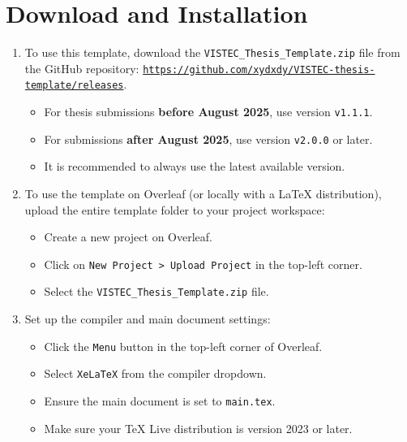 \documentclass{VISTEC}
\begin{document}
\section{Download and Installation}
\label{manual:download}
\begin{paragraph}
\begin{enumerate}[leftmargin=\paritemindent, itemsep=6pt]
\item To use this template, download the \texttt{VISTEC\_Thesis\_Template.zip} file from the GitHub repository: \href{https://github.com/xydxdy/VISTEC-thesis-template/releases}{\texttt{https://github.com/xydxdy/VISTEC-thesis-template/releases}}.

  \begin{itemize}[leftmargin=0.5cm]
    \item For thesis submissions \textbf{before August 2025}, use version \texttt{v1.1.1}.
    \item For submissions \textbf{after August 2025}, use version \texttt{v2.0.0} or later.
    \item It is recommended to always use the latest available version.
  \end{itemize}

\item To use the template on Overleaf (or locally with a LaTeX distribution), upload the entire template folder to your project workspace:

  \begin{itemize}[leftmargin=0.5cm]
    \item Create a new project on Overleaf.
    \item Click on \texttt{New Project > Upload Project} in the top-left corner.
    \item Select the \texttt{VISTEC\_Thesis\_Template.zip} file.
  \end{itemize}

\item Set up the compiler and main document settings:

  \begin{itemize}[leftmargin=0.5cm]
    \item Click the \texttt{Menu} button in the top-left corner of Overleaf.
    \item Select \texttt{XeLaTeX} from the compiler dropdown.
    \item Ensure the main document is set to \texttt{main.tex}.
    \item Make sure your TeX Live distribution is version 2023 or later.
  \end{itemize}
\end{enumerate}
\end{paragraph}
\end{document}
